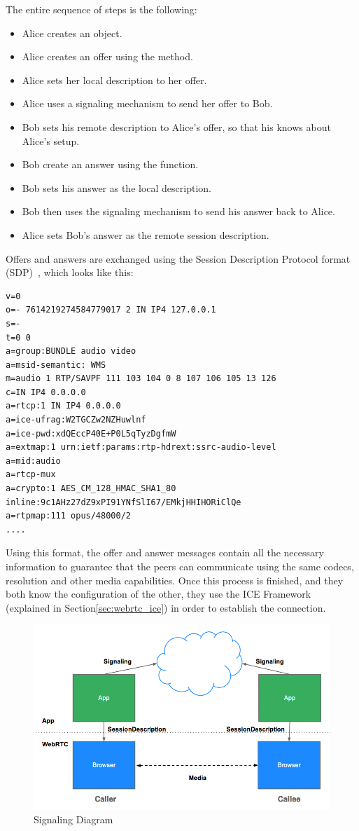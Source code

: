 The entire sequence of steps is the following:
\begin{itemize}
	\item Alice creates an \RTCPeerConnection object.
	\item Alice creates an offer using the \RTCPeerConnection \createOffer method.
	\item Alice sets her local description to her offer.
	\item Alice uses a signaling mechanism to send her offer to Bob.
	\item Bob sets his remote description to Alice's offer, so that his \RTCPeerConnection knows about Alice's setup.
	\item Bob create an answer using the \createAnswer function.
	\item Bob sets his answer as the local description.
	\item Bob then uses the signaling mechanism to send his answer back to Alice.
	\item Alice sets Bob's answer as the remote session description.
\end{itemize}
Offers and answers are exchanged using the Session Description Protocol format (SDP)~\cite{sdp}, which looks like this:
\begin{Verbatim}[frame=single]
v=0
o=- 7614219274584779017 2 IN IP4 127.0.0.1
s=-
t=0 0
a=group:BUNDLE audio video
a=msid-semantic: WMS
m=audio 1 RTP/SAVPF 111 103 104 0 8 107 106 105 13 126
c=IN IP4 0.0.0.0
a=rtcp:1 IN IP4 0.0.0.0
a=ice-ufrag:W2TGCZw2NZHuwlnf
a=ice-pwd:xdQEccP40E+P0L5qTyzDgfmW
a=extmap:1 urn:ietf:params:rtp-hdrext:ssrc-audio-level
a=mid:audio
a=rtcp-mux
a=crypto:1 AES_CM_128_HMAC_SHA1_80 inline:9c1AHz27dZ9xPI91YNfSlI67/EMkjHHIHORiClQe
a=rtpmap:111 opus/48000/2
....
\end{Verbatim}
Using this format, the offer and answer messages contain all the necessary information to guarantee that the peers can communicate using the same codecs, resolution and other media capabilities. 
Once this process is finished, and they both know the configuration of the other, they use the ICE Framework (explained in Section\ref{sec:webrtc_ice}) in order to establish the connection.

\begin{figure}[ht]
  \centering
  \includegraphics[keepaspectratio=true, width=\textwidth]{images/jsep}\caption{Signaling Diagram}
  \label{fig:jsep}
\end{figure}


